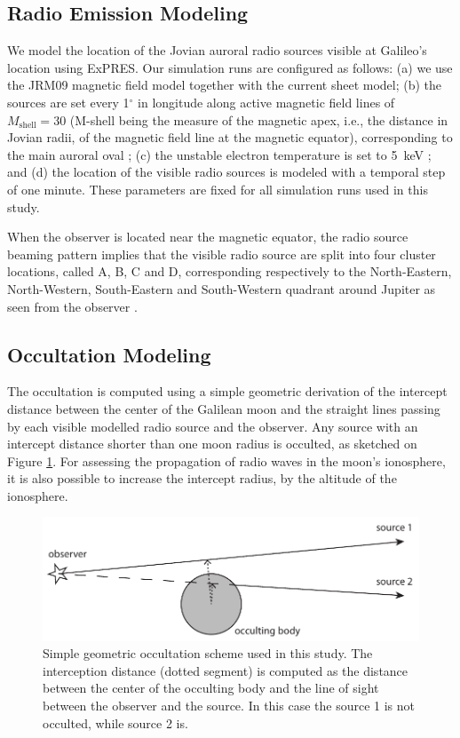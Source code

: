 \documentclass[referee]{aa}
\begin{document}
\subsection{Radio Emission Modeling}
\label{sec:ExPRES}
We model the location of the Jovian auroral radio sources visible at Galileo's location using ExPRES. Our simulation runs are configured as follows: (a) we use the JRM09 magnetic field model \citep{Connerney:2018jx} together with the \citet{CAN_1981} current sheet model; (b) the sources are set every 1$^\circ$ in longitude along active magnetic field lines of $M_\textrm{shell}=30$ (M-shell being the measure of the magnetic apex, i.e., the distance in Jovian radii, of the magnetic field line at the magnetic equator), corresponding to the main auroral oval \citep{Grodent:2015eo}; (c) the unstable electron temperature is set to 5~keV \citep{Louarn:2017bc}; and (d) the location of the visible radio sources is modeled with a temporal step of one minute. These parameters are fixed for all simulation runs used in this study.

When the observer is located near the magnetic equator, the radio source beaming pattern implies that the visible radio source are split into four cluster locations, called A, B, C and D, corresponding respectively to the North-Eastern, North-Western, South-Eastern and South-Western quadrant around Jupiter as seen from the observer \citep[see, e.g., Fig. 2 of][for a definition]{2017A&A...604A..17M}. 

\subsection{Occultation Modeling}
The occultation is computed using a simple geometric derivation of the intercept distance between the center of the Galilean moon and the straight lines passing by each visible modelled radio source and the observer. Any source with an intercept distance shorter than one moon radius is occulted, as sketched on Figure \ref{fig:occult}. For assessing the propagation of radio waves in the moon's ionosphere, it is also possible to increase the intercept radius, by the altitude of the ionosphere.


\begin{figure}[h]
\centering\includegraphics[width=0.7\linewidth]{occult.pdf}
\caption{Simple geometric occultation scheme used in this study. The interception distance (dotted segment) is computed as the distance between the center of the occulting body and the line of sight between the observer and the source. In this case the source 1 is not occulted, while source 2 is.}\label{fig:occult}
\end{figure}
\end{document}
